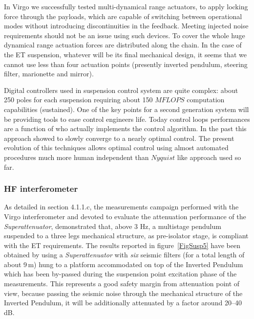 In Virgo we successfully tested multi-dynamical range actuators, to apply locking force through the payloads, which are capable of switching between operational modes without introducing discontinuities in the feedback. Meeting injected noise requirements should not be an issue using such devices. To cover the whole huge dynamical range actuation forces are distributed along the chain. In the case of the ET suspension, whatever will be its  final mechanical design,  it seems that we cannot use less than  four actuation points (presently inverted pendulum, steering filter, marionette and mirror). 

Digital controllers used in suspension control system are quite complex: about 250 poles for each suspension requiring about 150 $MFLOPS$ computation capabilities (sustained). One of the key points for a second generation system will be providing tools to ease control engineers life. Today control loops performances are a function of who actually implements the control algorithm. In the past this approach showed to slowly converge to a nearly optimal control. The present evolution of this techniques allows optimal control using almost automated procedures 
much more human independent than $Nyquist$ like approach used so far.
%
\subsubsection{HF interferometer}

As detailed in section 4.1.1.c, the measurements campaign performed with the Virgo interferometer and devoted to evaluate the attenuation performance of the \emph{Superattenuator}, demonstrated that, above 3 Hz, a multistage pendulum suspended to a three legs mechanical structure, as pre-isolator stage, is compliant with the ET requirements. The results reported in figure~\ref{FigSusp5} have been obtained by using a \emph{Superattenuator} 
with \emph{six} seismic filters (for a total length of about 9\,m) hung to a platform accommodated on top of the Inverted Pendulum which has been by-passed during the suspension point excitation phase of the measurements. This represents a good safety margin from attenuation point of view, because passing the seismic noise through the mechanical structure of the Inverted Pendulum, it will be additionally attenuated by a factor around 20--40\,dB.

